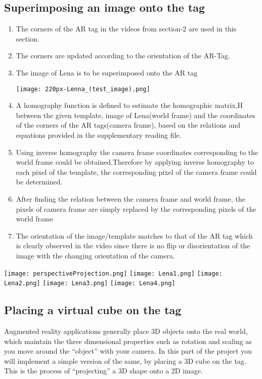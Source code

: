 \documentclass{article}
\begin{document}
\subsection{Superimposing an image onto the tag}
\begin{enumerate}
    \item  The corners of the AR tag in the videos from section-2 are used in this section.
    \item  The corners are updated according to the orientation of the AR-Tag.
    \item  The image of Lena is to be superimposed onto the AR tag
    \begin{center}

    \texttt{[image: 220px-Lenna\_(test\_image).png]}

    
\end{center}
    \item A homography function is defined to estimate the homographic matrix,H between the given template,
image of Lena(world frame) and the coordinates of the corners of the AR tags(camera frame), based
on the relations and equations provided in the supplementary reading file.
    \item Using inverse homography the camera frame coordinates corresponding to the world frame could be
obtained.Therefore by applying inverse homography to each pixel of the template, the corresponding pixel
of the camera frame could be determined.
    \item After finding the relation between the camera frame and world frame, the pixels of camera frame are
simply replaced by the corresponding pixels of the world frame
    \item The orientation of the image/template matches to that of the AR tag which is clearly observed in the
video since there is no flip or disorientation of the image with the changing orientation of the camera.
\end{enumerate}
\begin{center}

    \texttt{[image: perspectiveProjection.png]}
    \texttt{[image: Lena1.png]}
    \texttt{[image: Lena2.png]}
    \texttt{[image: Lena3.png]}
    \texttt{[image: Lena4.png]}
    

\end{center}
\subsection{Placing a virtual cube on the tag}
Augmented reality applications generally place 3D objects onto the real world, which maintain the three
dimensional properties such as rotation and scaling as you move around the “object” with your camera. In
this part of the project you will implement a simple version of the same, by placing a 3D cube on the tag.
This is the process of “projecting” a 3D shape onto a 2D image.
\end{document}
